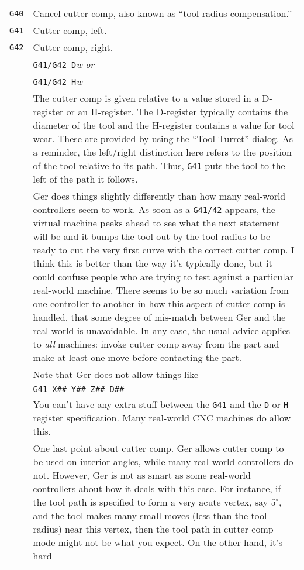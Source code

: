 \documentclass[titlepage,oneside,10pt]{article}
\begin{document}
\vskip 0.25cm
\begin{longtable}{lp{10cm}}
{\tt G40}&Cancel cutter comp, also known as ``tool radius compensation.''\\
{\tt G41}&Cutter comp, left.\\
{\tt G42}&Cutter comp, right. \\
&{\tt G41/G42 D}\emph{w} \emph{or}\\
&{\tt G41/G42 H}\emph{w} \\
& The cutter comp is given relative to a value stored in a
D-register or an H-register. The D-register typically contains the
diameter of the tool and the H-register contains a value for tool
wear. These are provided by using the ``Tool Turret'' dialog. As a
reminder, the left/right distinction here refers to the 
position of the tool relative to its path. Thus, {\tt G41} puts the
tool to the left of the path it follows.\\
&Ger does things slightly differently than how many real-world
controllers seem to work. As soon as a {\tt G41/42} appears, the
virtual machine peeks ahead to see what the next statement will be and
it bumps the tool out by the tool radius to be ready to cut the very
first curve with the correct cutter comp. I think this is better than the way
it's typically done, but it could confuse people who are trying to
test against a particular real-world machine. There seems to
be so much variation from one controller to another in how this aspect of
cutter comp is handled, that some degree of mis-match between Ger and
the real world is unavoidable. In any case, the usual advice applies
to \emph{all} machines: invoke cutter comp away from the part and make
at least one move before contacting the part. \\
& Note that Ger does not allow things like\\
& {\tt G41 X\#\# Y\#\# Z\#\# D\#\#}\\
& You can't have any extra stuff between the {\tt G41} and the {\tt D}
or {\tt H}-register specification. Many real-world CNC machines do
allow this.\\
& One last point about cutter comp. Ger allows cutter comp to be used
on interior angles, while many real-world controllers do not. However,
Ger is not as smart as some real-world controllers about how it deals
with this case. For instance, if the tool path is specified to form a
very acute vertex, say $5^\circ$, and the tool makes many small moves (less
than the tool radius) near this vertex, then the tool path in cutter
comp mode might not be what you expect. On the other hand, it's hard

\end{longtable}
\end{document}
